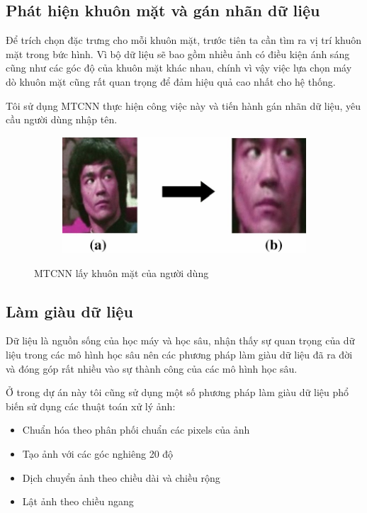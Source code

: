 \subsection{Phát hiện khuôn mặt và gán nhãn dữ liệu}
Để trích chọn đặc trưng cho mỗi khuôn mặt, trước tiên ta cần tìm ra
vị trí khuôn mặt trong bức hình. Vì bộ dữ liệu sẽ bao gồm nhiều ảnh
có điều kiện ánh sáng cũng như các góc độ của khuôn mặt khác nhau,
chính vì vậy việc lựa chọn máy dò khuôn mặt cũng rất quan trọng để đảm
hiệu quả cao nhất cho hệ thống.

Tôi sử dụng MTCNN thực hiện công việc này và tiến hành gán nhãn dữ liệu,
yêu cầu người dùng nhập tên.

\begin{figure}
    \begin{subfigure}{0.6\textwidth}
        \includegraphics[width=1\linewidth]{Chapters/items/chap3_3.jpg}
        \label{fig:chap3_3}
    \end{subfigure}
    \caption{MTCNN lấy khuôn mặt của người dùng}
\end{figure}

\subsection{Làm giàu dữ liệu}

Dữ liệu là nguồn sống của học máy và học sâu, nhận thấy sự quan trọng của dữ liệu
trong các mô hình học sâu nên các phương pháp làm giàu dữ liệu đã ra đời và đóng góp rất nhiều
vào sự thành công của các mô hình học sâu.

Ở trong dự án này tôi cũng sử dụng một số phương pháp làm giàu dữ liệu phổ biến sử dụng các thuật toán xử lý ảnh:
\begin{itemize}
    \item Chuẩn hóa theo phân phối chuẩn các pixels của ảnh
    \item Tạo ảnh với các góc nghiêng 20 độ
    \item Dịch chuyển ảnh theo chiều dài và chiều rộng
    \item Lật ảnh theo chiều ngang
\end{itemize}

